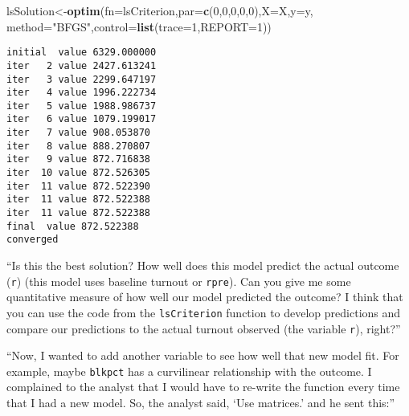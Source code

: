 \documentclass[10pt,]{article}
\newenvironment{Shaded}{\begin{snugshade}}{\end{snugshade}}
\newcommand{\KeywordTok}[1]{\textcolor[rgb]{0.13,0.29,0.53}{\textbf{{#1}}}}
\newcommand{\DataTypeTok}[1]{\textcolor[rgb]{0.13,0.29,0.53}{{#1}}}
\newcommand{\DecValTok}[1]{\textcolor[rgb]{0.00,0.00,0.81}{{#1}}}
\newcommand{\StringTok}[1]{\textcolor[rgb]{0.31,0.60,0.02}{{#1}}}
\newcommand{\NormalTok}[1]{{#1}}
\begin{document}
\begin{Shaded}
\begin{Highlighting}[]
\NormalTok{lsSolution<-}\KeywordTok{optim}\NormalTok{(}\DataTypeTok{fn=}\NormalTok{lsCriterion,}\DataTypeTok{par=}\KeywordTok{c}\NormalTok{(}\DecValTok{0}\NormalTok{,}\DecValTok{0}\NormalTok{,}\DecValTok{0}\NormalTok{,}\DecValTok{0}\NormalTok{,}\DecValTok{0}\NormalTok{),}\DataTypeTok{X=}\NormalTok{X,}\DataTypeTok{y=}\NormalTok{y,}
          \DataTypeTok{method=}\StringTok{"BFGS"}\NormalTok{,}\DataTypeTok{control=}\KeywordTok{list}\NormalTok{(}\DataTypeTok{trace=}\DecValTok{1}\NormalTok{,}\DataTypeTok{REPORT=}\DecValTok{1}\NormalTok{))}
\end{Highlighting}
\end{Shaded}

\begin{verbatim}
initial  value 6329.000000 
iter   2 value 2427.613241
iter   3 value 2299.647197
iter   4 value 1996.222734
iter   5 value 1988.986737
iter   6 value 1079.199017
iter   7 value 908.053870
iter   8 value 888.270807
iter   9 value 872.716838
iter  10 value 872.526305
iter  11 value 872.522390
iter  11 value 872.522388
iter  11 value 872.522388
final  value 872.522388 
converged
\end{verbatim}

``Is this the best solution? How well does this model predict the actual
outcome (\texttt{r}) (this model uses baseline turnout or
\texttt{rpre}). Can you give me some quantitative measure of how well
our model predicted the outcome? I think that you can use the code from
the \texttt{lsCriterion} function to develop predictions and compare our
predictions to the actual turnout observed (the variable \texttt{r}),
right?''

``Now, I wanted to add another variable to see how well that new model
fit. For example, maybe \texttt{blkpct} has a curvilinear relationship
with the outcome. I complained to the analyst that I would have to
re-write the function every time that I had a new model. So, the analyst
said, `Use matrices.' and he sent this:''

\begin{Shaded}
\end{Shaded}
\end{document}
